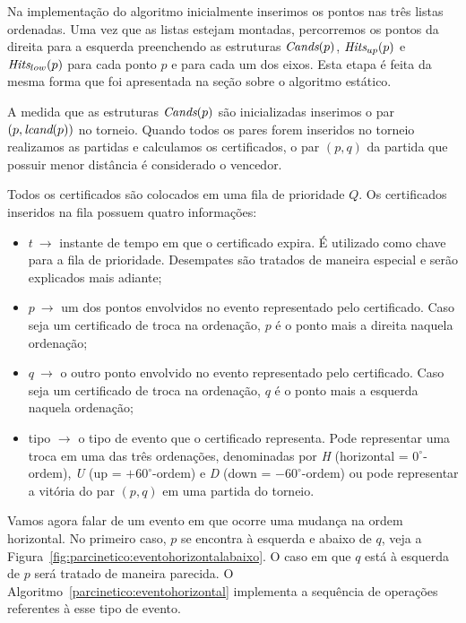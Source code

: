 Na implementação do algoritmo inicialmente inserimos os pontos nas três listas ordenadas.
Uma vez que as listas estejam montadas, percorremos os pontos da direita para a esquerda
preenchendo as estruturas $\textit{Cands}(p)$, $\textit{Hits}_{up}(p)$ e $\textit{Hits}_{low}(p)$ para cada ponto $p$ e
para cada um dos eixos.
Esta etapa é feita da mesma forma que foi apresentada na seção sobre o algoritmo estático.

A medida que as estruturas $\textit{Cands}(p)$ são inicializadas inserimos o par $(p, \textit{lcand}(p))$ no
torneio.
Quando todos os pares forem inseridos no torneio realizamos as partidas e calculamos os
certificados, o par $(p, q)$ da partida que possuir menor distância é considerado o vencedor.

Todos os certificados são colocados em uma fila de prioridade $Q$.
Os certificados inseridos na fila possuem quatro informações:
\begin{itemize}
    \item $t~\rightarrow$ instante de tempo em que o certificado
    expira.
    É utilizado como chave para a fila de prioridade.
    Desempates são tratados de maneira especial e serão explicados
    mais adiante;
    \item $p~\rightarrow$ um dos pontos envolvidos no evento
    representado pelo certificado.
    Caso seja um certificado de troca na ordenação, $p$ é o ponto mais a direita naquela ordenação;
    \item $q~\rightarrow$ o outro ponto envolvido no evento representado pelo certificado.
    Caso seja um certificado de troca na ordenação, $q$ é o ponto mais a esquerda naquela
    ordenação;
    \item tipo $ \rightarrow$ o tipo de evento que o certificado representa.
    Pode representar uma troca em uma das três ordenações, denominadas por \textit{H} (horizontal =
    $0^\circ$-ordem), \textit{U} (up = $+60^\circ$-ordem) e \textit{D} (down = $-60^\circ$-ordem) ou pode
    representar a vitória do par $(p, q)$ em uma partida do torneio.
\end{itemize}

Vamos agora falar de um evento em que ocorre uma mudança na ordem horizontal.
No primeiro caso, $p$ se encontra à esquerda e abaixo de $q$, veja a
Figura~\ref{fig:parcinetico:eventohorizontalabaixo}.
O caso em que $q$ está à esquerda de $p$ será tratado de maneira parecida.
O Algoritmo~\ref{parcinetico:eventohorizontal} implementa a sequência de operações referentes à
esse tipo de evento.



